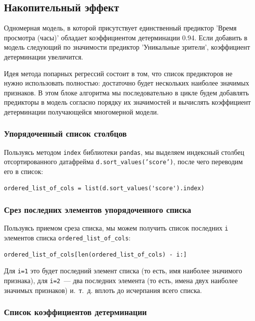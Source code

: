 \documentclass[a4paper,12pt]{article}
\begin{document}
\subsection{Накопительный эффект}

Одномерная модель, в которой присутствует единственный предиктор 'Время просмотра (часы)' обладает коэффициентом детерминации 0.94. Если добавить в модель следующий по значимости предиктор 'Уникальные зрители', коэффициент детерминации увеличится. 

Идея метода попарных регрессий состоит в том, что список предикторов не нужно использовать полностью: достаточно будет нескольких наиболее значимых признаков. В этом блоке алгоритма мы последовательно в цикле будем добавлять предикторы в модель согласно порядку их значимостей и вычислять коэффициент детерминации получающейся многомерной модели.



\subsubsection{Упорядоченный список столбцов}

Пользуясь методом \texttt{index} библиотеки \texttt{pandas}, мы выделяем индексный столбец отсортированного датафрейма \texttt{d.sort\_values('score')}, после чего переводим его в список:
\begin{verbatim}
ordered_list_of_cols = list(d.sort_values('score').index)
\end{verbatim}



\subsubsection{Срез последних элементов упорядоченного списка}

Пользуясь приемом среза списка, мы можем получить список последних \texttt{i} элементов списка \texttt{ordered\_list\_of\_cols}:
\begin{verbatim}
ordered_list_of_cols[len(ordered_list_of_cols) - i:]
\end{verbatim}
Для \texttt{i=1} это будет последний элемент списка (то есть, имя наиболее значимого признака), для \texttt{i=2} — два последних элемента (то есть, имена двух наиболее значимых признаков) и. т. д. вплоть до исчерпания всего списка.


\subsubsection{Список коэффициентов детерминации}
\end{document}
